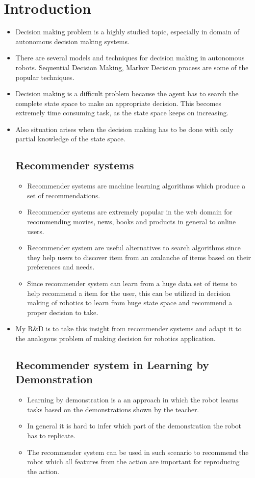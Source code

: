 \documentclass[a4paper, 10pt]{report}   %
\begin{document}
\section*{Introduction}             %
\begin{itemize}
	\item Decision making problem is a highly studied topic, especially in domain of autonomous decision making systems.
	\item There are several models and techniques for decision making in autonomous robots. Sequential Decision Making, Markov Decision process are some of the popular techniques.
	\item Decision making is a difficult problem because the agent has to search the complete state space to make an appropriate decision. This becomes extremely time consuming task, as the state space keeps on increasing.
	\item Also situation arises when the decision making has to be done with only partial knowledge of the state space.
\subsection*{Recommender systems}
\begin{itemize}
	\item Recommender systems are machine learning algorithms which produce a set of recommendations.
	\item Recommender systems are extremely popular in the web domain for recommending movies, news, books and products in general to online users.
	\item Recommender system are useful alternatives to search algorithms since they help users to discover item from an avalanche of items based on their preferences and needs.
	\item Since recommender system can learn from a huge data set of items to help recommend a item for the user, this can be utilized in decision making of robotics to learn from huge state space and recommend a proper decision to take.
\end{itemize}
\label{sub:}

	\item {My R\&D is to take this insight from recommender systems and adapt it to the analogous problem of making decision for robotics application.}
\subsection*{Recommender system in Learning by Demonstration}
\begin{itemize}
	\item Learning by demonstration is a an approach in which the robot learns tasks based on the demonstrations shown by the teacher.
	\item In general it is hard to infer which part of the demonstration the robot has to replicate.
	\item The recommender system can be used in such scenario to recommend the robot which all features from the action are important for reproducing the action.
\end{itemize}
\label{sub:}


\end{itemize}
\end{document}
